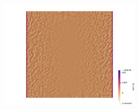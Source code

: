 \begin{center}
\includegraphics[width=7cm]{python_codes/fieldstone_12/results/rand/erq6}
\end{center}



